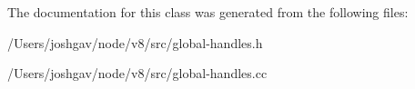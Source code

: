 The documentation for this class was generated from the following files\+:\begin{DoxyCompactItemize}
\item 
/\+Users/joshgav/node/v8/src/global-\/handles.\+h\item 
/\+Users/joshgav/node/v8/src/global-\/handles.\+cc\end{DoxyCompactItemize}
